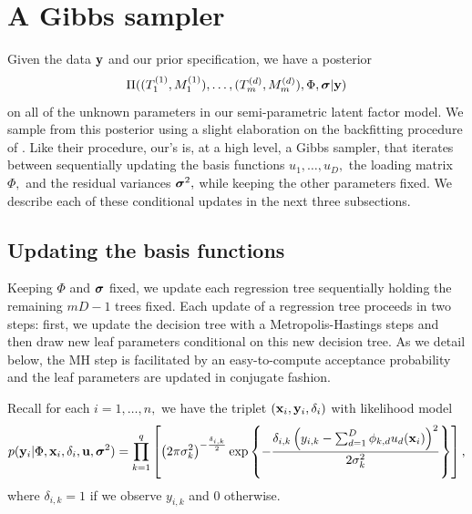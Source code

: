 \documentclass[12pt]{article}
\begin{document}
\section{A Gibbs sampler}

Given the data $\mathbf{y}$ and our prior specification, we have a posterior 
$$
\Pi( (T_{1}^{(1)}, M_{1}^{(1)}), \ldots, (T^{(d)}_{m}, M^{(d)}_{m}), \Phi, \boldsymbol{\sigma} | \mathbf{y})
$$
on all of the unknown parameters in our semi-parametric latent factor model. 
We sample from this posterior using a slight elaboration on the backfitting procedure of \citet{Chipman2010}.
Like their procedure, our's is, at a high level, a Gibbs sampler, that iterates between sequentially updating the basis functions $u_{1}, \ldots, u_{D},$ the loading matrix $\Phi,$ and the residual variances $\boldsymbol{\sigma}^{2},$ while keeping the other parameters fixed.
We describe each of these conditional updates in the next three subsections.

\subsection{Updating the basis functions}

Keeping $\Phi$ and $\boldsymbol{\sigma}$ fixed, we update each regression tree sequentially holding the remaining $mD - 1$ trees fixed.
Each update of a regression tree proceeds in two steps: first, we update the decision tree with a Metropolis-Hastings steps and then draw new leaf parameters conditional on this new decision tree.
As we detail below, the MH step is facilitated by an easy-to-compute acceptance probability and the leaf parameters are updated in conjugate fashion.

Recall for each $i = 1, \ldots, n,$ we have the triplet $(\mathbf{x}_{i}, \mathbf{y}_{i}, \delta_{i})$ with likelihood model
$$
p(\mathbf{y}_{i} | \Phi, \mathbf{x}_{i}, \delta_{i}, \mathbf{u}, \boldsymbol{\sigma}^{2}) = \prod_{k = 1}^{q}\left[\left(2\pi\sigma^{2}_{k}\right)^{-\frac{\delta_{i,k}}{2}}\exp\left\{-\frac{\delta_{i,k}\left(y_{i,k} - \sum_{d = 1}^{D}{\phi_{k,d}u_{d}(\mathbf{x}_{i})}\right)^{2}}{2\sigma^{2}_{k}}\right\}\right],
$$
where $\delta_{i,k} = 1$ if we observe $y_{i,k}$ and 0 otherwise.
\end{document}
